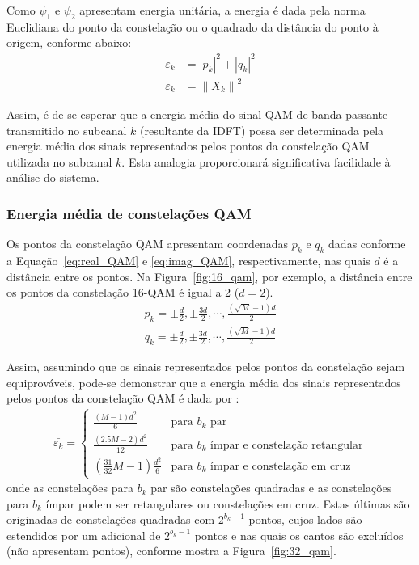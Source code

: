 Como $\psi_1$ e $\psi_2$ apresentam energia unitária, a energia é dada pela norma Euclidiana do ponto da constelação ou o quadrado da distância do ponto à origem, conforme abaixo:
\begin{align}
\varepsilon_k &= \left| p_k \right|^2 +  \left| q_k \right|^2 \nonumber\\
\varepsilon_k &= \left\| X_k \right\|^2
\end{align}

Assim, é de se esperar que a energia média do sinal QAM de banda passante transmitido no subcanal $k$ (resultante da IDFT) possa ser determinada pela energia média dos sinais representados pelos pontos da constelação QAM utilizada no subcanal $k$. Esta analogia proporcionará significativa facilidade à análise do sistema.

\subsubsection{Energia média de constelações QAM}

Os pontos da constelação QAM apresentam coordenadas $p_k$ e $q_k$ dadas conforme a Equação~\ref{eq:real_QAM} e \ref{eq:imag_QAM}, respectivamente, nas quais $d$ é a distância entre os pontos. Na Figura~\ref{fig:16_qam}, por exemplo, a distância entre os pontos da constelação 16-QAM é igual a 2 ($d=2$).
\begin{align}
p_k  = \pm \frac{d}{2},  \pm \frac{3d}{2}, \cdots, \frac{\left( \sqrt{M} -1 \right)d}{2}
\label{eq:real_QAM}
\end{align}
\begin{align}
q_k  = \pm \frac{d}{2},  \pm \frac{3d}{2}, \cdots, \frac{\left( \sqrt{M} -1 \right)d}{2}
\label{eq:imag_QAM}
\end{align}

Assim, assumindo que os sinais representados pelos pontos da constelação sejam equiprováveis, pode-se demonstrar que a energia média dos sinais representados pelos pontos da constelação QAM é dada por \cite{ee379a}:
\begin{align}
\bar{\varepsilon_k} = \begin{cases}
			\frac{\left( M -1 \right) d^2}{6} 			& \text{para $b_k$ par}\\
			\frac{(2.5M - 2)d^2}{12}				& \text{para $b_k$ ímpar e constelação retangular}\\
			\left( \frac{31}{32}M	 - 1 \right) \frac{d^2}{6} & \text{para $b_k$ ímpar e constelação em cruz}
		  \end{cases}
\end{align}
onde as constelações para $b_k$ par são constelações quadradas e as constelações para $b_k$ ímpar podem ser retangulares ou constelações em cruz. Estas últimas são originadas de constelações quadradas com $2^{b_k-1}$ pontos, cujos lados são estendidos por um adicional de $2^{b_k-1}$ pontos e nas quais os cantos são excluídos (não apresentam pontos), conforme mostra a Figura~\ref{fig:32_qam}.

